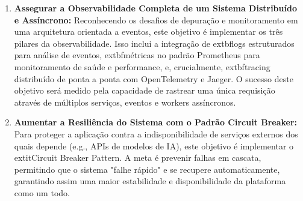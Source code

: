 \begin{enumerate}
    \item \textbf{Assegurar a Observabilidade Completa de um Sistema Distribuído e Assíncrono:} Reconhecendo os desafios de depuração e monitoramento em uma arquitetura orientada a eventos, este objetivo é implementar os três pilares da observabilidade. Isso inclui a integração de 	extbf{logs estruturados} para análise de eventos, 	extbf{métricas} no padrão Prometheus para monitoramento de saúde e performance, e, crucialmente, 	extbf{tracing distribuído} de ponta a ponta com OpenTelemetry e Jaeger. O sucesso deste objetivo será medido pela capacidade de rastrear uma única requisição através de múltiplos serviços, eventos e workers assíncronos.

    \item \textbf{Aumentar a Resiliência do Sistema com o Padrão Circuit Breaker:} Para proteger a aplicação contra a indisponibilidade de serviços externos dos quais depende (e.g., APIs de modelos de IA), este objetivo é implementar o 	extit{Circuit Breaker Pattern}. A meta é prevenir falhas em cascata, permitindo que o sistema "falhe rápido" e se recupere automaticamente, garantindo assim uma maior estabilidade e disponibilidade da plataforma como um todo.
\end{enumerate}
